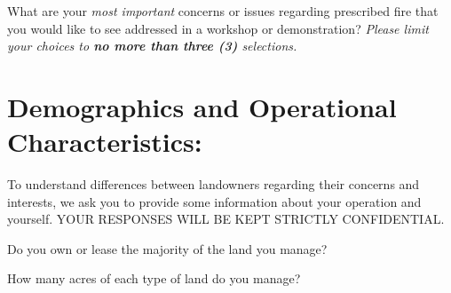 \documentclass[
  english,
  checkmode = fill,
  ]{sdapsclassic}
\begin{document}
\begin{questionnaire}
    \begin{choicequestion}[cols=2]{What are your \emph{most important} concerns or issues regarding prescribed fire that you would like to see addressed in a workshop or demonstration? \emph{Please limit your choices to \textbf{no more than three (3)} selections.}}
    \end{choicequestion}  

\vspace{5em}
  
    \section{Demographics and Operational Characteristics:}
    
  To understand differences between landowners regarding their concerns and interests, we ask you to provide some information about your operation and yourself. YOUR RESPONSES WILL BE KEPT STRICTLY CONFIDENTIAL.
    

    \begin{choicequestion}[cols=3]{Do you own or lease the majority of the land you manage?}
    \end{choicequestion}

    \begin{choicequestion}[cols=1]{How many acres of each type of land do you manage?}
    \end{choicequestion}      
    

\end{questionnaire}
\end{document}
